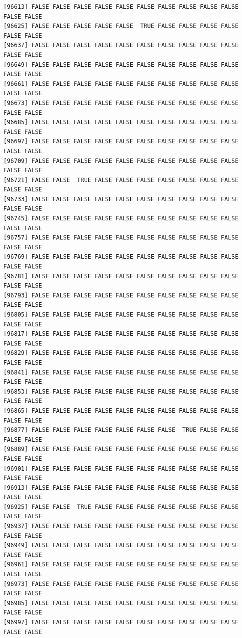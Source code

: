 \documentclass[
  a4paper,
  DIV=11,
  numbers=noendperiod]{scrartcl}
\begin{document}
\begin{verbatim}
[96613] FALSE FALSE FALSE FALSE FALSE FALSE FALSE FALSE FALSE FALSE FALSE FALSE
[96625] FALSE FALSE FALSE FALSE FALSE  TRUE FALSE FALSE FALSE FALSE FALSE FALSE
[96637] FALSE FALSE FALSE FALSE FALSE FALSE FALSE FALSE FALSE FALSE FALSE FALSE
[96649] FALSE FALSE FALSE FALSE FALSE FALSE FALSE FALSE FALSE FALSE FALSE FALSE
[96661] FALSE FALSE FALSE FALSE FALSE FALSE FALSE FALSE FALSE FALSE FALSE FALSE
[96673] FALSE FALSE FALSE FALSE FALSE FALSE FALSE FALSE FALSE FALSE FALSE FALSE
[96685] FALSE FALSE FALSE FALSE FALSE FALSE FALSE FALSE FALSE FALSE FALSE FALSE
[96697] FALSE FALSE FALSE FALSE FALSE FALSE FALSE FALSE FALSE FALSE FALSE FALSE
[96709] FALSE FALSE FALSE FALSE FALSE FALSE FALSE FALSE FALSE FALSE FALSE FALSE
[96721] FALSE FALSE  TRUE FALSE FALSE FALSE FALSE FALSE FALSE FALSE FALSE FALSE
[96733] FALSE FALSE FALSE FALSE FALSE FALSE FALSE FALSE FALSE FALSE FALSE FALSE
[96745] FALSE FALSE FALSE FALSE FALSE FALSE FALSE FALSE FALSE FALSE FALSE FALSE
[96757] FALSE FALSE FALSE FALSE FALSE FALSE FALSE FALSE FALSE FALSE FALSE FALSE
[96769] FALSE FALSE FALSE FALSE FALSE FALSE FALSE FALSE FALSE FALSE FALSE FALSE
[96781] FALSE FALSE FALSE FALSE FALSE FALSE FALSE FALSE FALSE FALSE FALSE FALSE
[96793] FALSE FALSE FALSE FALSE FALSE FALSE FALSE FALSE FALSE FALSE FALSE FALSE
[96805] FALSE FALSE FALSE FALSE FALSE FALSE FALSE FALSE FALSE FALSE FALSE FALSE
[96817] FALSE FALSE FALSE FALSE FALSE FALSE FALSE FALSE FALSE FALSE FALSE FALSE
[96829] FALSE FALSE FALSE FALSE FALSE FALSE FALSE FALSE FALSE FALSE FALSE FALSE
[96841] FALSE FALSE FALSE FALSE FALSE FALSE FALSE FALSE FALSE FALSE FALSE FALSE
[96853] FALSE FALSE FALSE FALSE FALSE FALSE FALSE FALSE FALSE FALSE FALSE FALSE
[96865] FALSE FALSE FALSE FALSE FALSE FALSE FALSE FALSE FALSE FALSE FALSE FALSE
[96877] FALSE FALSE FALSE FALSE FALSE FALSE FALSE  TRUE FALSE FALSE FALSE FALSE
[96889] FALSE FALSE FALSE FALSE FALSE FALSE FALSE FALSE FALSE FALSE FALSE FALSE
[96901] FALSE FALSE FALSE FALSE FALSE FALSE FALSE FALSE FALSE FALSE FALSE FALSE
[96913] FALSE FALSE FALSE FALSE FALSE FALSE FALSE FALSE FALSE FALSE FALSE FALSE
[96925] FALSE FALSE  TRUE FALSE FALSE FALSE FALSE FALSE FALSE FALSE FALSE FALSE
[96937] FALSE FALSE FALSE FALSE FALSE FALSE FALSE FALSE FALSE FALSE FALSE FALSE
[96949] FALSE FALSE FALSE FALSE FALSE FALSE FALSE FALSE FALSE FALSE FALSE FALSE
[96961] FALSE FALSE FALSE FALSE FALSE FALSE FALSE FALSE FALSE FALSE FALSE FALSE
[96973] FALSE FALSE FALSE FALSE FALSE FALSE FALSE FALSE FALSE FALSE FALSE FALSE
[96985] FALSE FALSE FALSE FALSE FALSE FALSE FALSE FALSE FALSE FALSE FALSE FALSE
[96997] FALSE FALSE FALSE FALSE FALSE FALSE FALSE FALSE FALSE FALSE FALSE FALSE

\end{verbatim}
\end{document}
